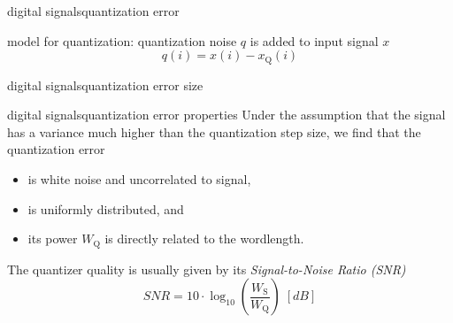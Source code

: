         \begin{frame}{digital signals}{quantization error}
            \begin{figure}
                
            \end{figure}
            \bigskip
            \pause
            
            model for quantization: quantization noise $q$ is added to input signal $x$
            \begin{equation*}
                q(i) = x(i) - x_{\mathrm{Q}}(i)
            \end{equation*}
        \end{frame}		
        \begin{frame}{digital signals}{quantization error size}

        \end{frame}	

        \begin{frame}{digital signals}{quantization error properties}
            Under the assumption that the signal has a variance much higher than the quantization step size, we find that the quantization error
            \begin{itemize}
                \item   is white noise and uncorrelated to signal,
                \item   is uniformly distributed, and
                \item   its power $W_\mathrm{Q}$ is directly related to the wordlength.
            \end{itemize}
            
            \pause
            \bigskip
            The quantizer quality is usually given by its \textit{Signal-to-Noise Ratio (SNR)}
			\begin{equation*}\label{eq:snr}
				SNR = 10\cdot\log_{10}\left(\frac{W_{\mathrm{S}}}{W_{\mathrm{Q}}}\right)\; [dB] 
			\end{equation*}
            
            \end{frame}	
            

